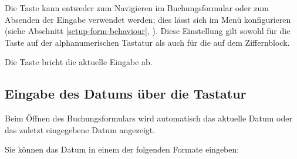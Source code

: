 Die Taste  kann entweder zum Navigieren im Buchungsformular oder zum Absenden der Eingabe verwendet werden; dies lässt sich im Menü  konfigurieren (siehe Abschnitt \vref{setup-form-behaviour}, ). Diese Einstellung gilt sowohl für die Taste  auf der alphanumerischen Tastatur als auch für die auf dem Ziffernblock.

Die Taste  bricht die aktuelle Eingabe ab.


\subsection{Eingabe des Datums über die Tastatur\label{transactions-new-dates}}

Beim Öffnen des Buchungsformulars wird automatisch das aktuelle Datum oder das zuletzt eingegebene Datum angezeigt.

Sie können das Datum in einem der folgenden Formate eingeben:


